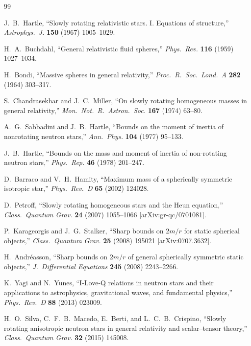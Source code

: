 \documentclass[11pt]{article}
\theoremstyle{plain}
\theoremstyle{definition}
\begin{document}
\begin{thebibliography}{99}

J.~B.~Hartle,
``Slowly rotating relativistic stars. I. Equations of structure,''
\emph{Astrophys.\ J.} \textbf{150} (1967) 1005--1029.

H.~A.~Buchdahl,
``General relativistic fluid spheres,''
\emph{Phys.\ Rev.} \textbf{116} (1959) 1027--1034.

H.~Bondi,
``Massive spheres in general relativity,''
\emph{Proc.\ R.\ Soc.\ Lond.\ A} \textbf{282} (1964) 303--317.

S.~Chandrasekhar and J.~C.~Miller,
``On slowly rotating homogeneous masses in general relativity,''
\emph{Mon.\ Not.\ R.\ Astron.\ Soc.} \textbf{167} (1974) 63--80.

A.~G.~Sabbadini and J.~B.~Hartle,
``Bounds on the moment of inertia of nonrotating neutron stars,''
\emph{Ann.\ Phys.} \textbf{104} (1977) 95--133.

J.~B.~Hartle,
``Bounds on the mass and moment of inertia of non-rotating neutron stars,''
\emph{Phys.\ Rep.} \textbf{46} (1978) 201--247.

D.~Barraco and V.~H.~Hamity,
``Maximum mass of a spherically symmetric isotropic star,''
\emph{Phys.\ Rev.\ D} \textbf{65} (2002) 124028.

D.~Petroff,
``Slowly rotating homogeneous stars and the Heun equation,''
\emph{Class.\ Quantum Grav.} \textbf{24} (2007) 1055--1066 [arXiv:gr-qc/0701081].

P.~Karageorgis and J.~G.~Stalker,
``Sharp bounds on $2m/r$ for static spherical objects,''
\emph{Class.\ Quantum Grav.} \textbf{25} (2008) 195021 [arXiv:0707.3632].

H.~Andr\'easson,
``Sharp bounds on $2m/r$ of general spherically symmetric static objects,''
\emph{J.\ Differential Equations} \textbf{245} (2008) 2243--2266.

K.~Yagi and N.~Yunes,
``I-Love-Q relations in neutron stars and their applications to astrophysics, gravitational waves, and fundamental physics,''
\emph{Phys.\ Rev.\ D} \textbf{88} (2013) 023009.

H.~O.~Silva, C.~F.~B.~Macedo, E.~Berti, and L.~C.~B.~Crispino,
``Slowly rotating anisotropic neutron stars in general relativity and scalar--tensor theory,''
\emph{Class.\ Quantum Grav.} \textbf{32} (2015) 145008.


\end{thebibliography}
\end{document}
